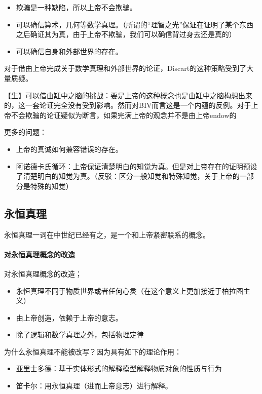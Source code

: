 \begin{itemize}
    \item 欺骗是一种缺陷，所以上帝不会欺骗。
    \item 可以确信算术，几何等数学真理。（所谓的“理智之光”保证在证明了某个东西之后确证其为真，由于上帝不欺骗，我们可以确信背过身去还是真的）
    \item 可以确信自身和外部世界的存在。
\end{itemize}

对于借由上帝完成关于数学真理和外部世界的论证，Discart的这种策略受到了大量质疑。

【生】可以借由缸中之脑的挑战：要是上帝的这种概念也是由缸中之脑构想出来的，这一套论证完全没有受到影响。然而对BIV而言这是一个内蕴的反例。对于上帝不会欺骗的论证疑似为断言，如果完满上帝的观念并不是由上帝endow的

更多的问题：

\begin{itemize}
    \item 上帝的真诚如何兼容错误的存在。
    \item 阿诺德卡氏循环：上帝保证清楚明白的知觉为真。但是对上帝存在的证明预设了清楚明白的知觉为真。（反驳：区分一般知觉和特殊知觉，关于上帝的一部分是特殊的知觉）
\end{itemize}

\subsection{永恒真理}

永恒真理一词在中世纪已经有之，是一个和上帝紧密联系的概念。

\paragraph{对永恒真理概念的改造}

对永恒真理概念的改造；

\begin{itemize}
    \item 永恒真理不同于物质世界或者任何心灵（在这个意义上更加接近于柏拉图主义）
    \item 由上帝创造，依赖于上帝的意志。
    \item 除了逻辑和数学真理之外，包括物理定律
\end{itemize}

为什么永恒真理不能被改写？因为具有如下的理论作用：

\begin{itemize}
    \item 亚里士多德：基于实体形式的解释模型解释物质对象的性质与行为
    \item 笛卡尔：用永恒真理（进而上帝意志）进行解释。
\end{itemize}


